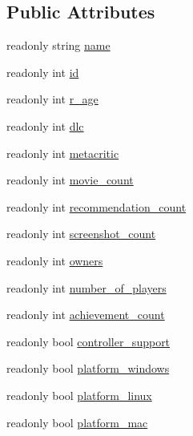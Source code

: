 \subsection*{Public Attributes}
\begin{DoxyCompactItemize}
\item 
readonly string \hyperlink{class_projeto1___l_p2_1_1_games_info_a294805ec86898220982ae0fb596f75c5}{name}
\item 
readonly int \hyperlink{class_projeto1___l_p2_1_1_games_info_a81a45f0e08e304859835a56bd712847a}{id}
\item 
readonly int \hyperlink{class_projeto1___l_p2_1_1_games_info_a941362c953158865a590eba893aa9046}{r\+\_\+age}
\item 
readonly int \hyperlink{class_projeto1___l_p2_1_1_games_info_a43e6361cc6c725986e64696d254cead2}{dlc}
\item 
readonly int \hyperlink{class_projeto1___l_p2_1_1_games_info_aab98d5024f6173a2ca5fdabc25d34d70}{metacritic}
\item 
readonly int \hyperlink{class_projeto1___l_p2_1_1_games_info_a0703d3a1ed84349e81b7f88fd46d06c0}{movie\+\_\+count}
\item 
readonly int \hyperlink{class_projeto1___l_p2_1_1_games_info_a238a505ff28073490edc1cf842f9eaff}{recommendation\+\_\+count}
\item 
readonly int \hyperlink{class_projeto1___l_p2_1_1_games_info_ad0145cfa3e657b97e9a6ee76fafdace5}{screenshot\+\_\+count}
\item 
readonly int \hyperlink{class_projeto1___l_p2_1_1_games_info_a2b9e5f8c493101537bf26ee43d649035}{owners}
\item 
readonly int \hyperlink{class_projeto1___l_p2_1_1_games_info_ac4e30ca26e0b346870621f0eee5803e5}{number\+\_\+of\+\_\+players}
\item 
readonly int \hyperlink{class_projeto1___l_p2_1_1_games_info_a37a53fa6f569c02224ec9a805afa070f}{achievement\+\_\+count}
\item 
readonly bool \hyperlink{class_projeto1___l_p2_1_1_games_info_a8f889b888f223f2ee6c3366e1d2511c7}{controller\+\_\+support}
\item 
readonly bool \hyperlink{class_projeto1___l_p2_1_1_games_info_af0a8f0ec3c1279f41dccdfcbd6aa818e}{platform\+\_\+windows}
\item 
readonly bool \hyperlink{class_projeto1___l_p2_1_1_games_info_af53ed11992522eddaaf654499fc79d86}{platform\+\_\+linux}
\item 
readonly bool \hyperlink{class_projeto1___l_p2_1_1_games_info_a6b08e5334afc367314732b3cf84fb4e5}{platform\+\_\+mac}

\end{DoxyCompactItemize}
